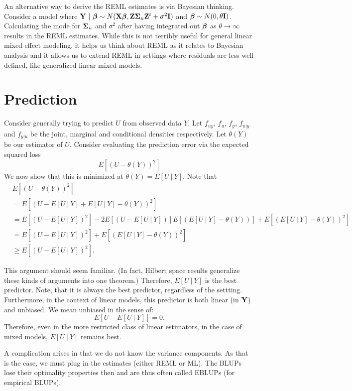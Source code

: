 An alternative way to derive the REML estimates is via Bayesian thinking. Consider a 
model where $\mathbf{Y} ~|~\boldsymbol{\beta} \sim N(\mathbf{X} \boldsymbol{\beta}, \mathbf{Z} \boldsymbol{\Sigma}_u \mathbf{Z}^t +\sigma^2 \mathbf{I})$ 
and $\boldsymbol{\beta} \sim N(0, \theta \mathbf{I})$. Calculating the mode for $\boldsymbol{\Sigma}_u$ and $\sigma^2$
after having integrated out $\boldsymbol{\beta}$ as $\theta \rightarrow \infty$ results in the REML estimates.
While this is not terribly useful for general linear mixed effect modeling, it helps us think
about REML as it relates to Bayesian analysis and it allows us to extend REML in settings
where residuals are less well defined, like generalized linear mixed models.


\section{Prediction}

Consider generally trying to predict $U$ from observed data $Y$. 
Let $f_{uy}$, $f_u$, $f_y$, $f_{u|y}$ and $f_{y|u}$ be the
joint, marginal and conditional densities respectively. Let
$\theta(Y)$ be our estimator of $U$. Consider
evaluating the prediction error via the expected squared loss
$$
E[(U -\theta(Y))^2]
$$
We now show that this is  minimized at $\theta(Y) = E[U ~|~ Y]$. 
Note that
\begin{align*}
& E[(U -\theta(Y))^2] \\ 
& = E[(U - E[U ~|~ Y] + E[U ~|~ Y] - \theta(Y))^2] \\
& = E[(U - E[U ~|~ Y])^2] - 2 E[(U - E[U~|~Y])]E[(E[U~|~Y] - \theta(Y))] + E[(E[U~|~Y] - \theta(Y))^2] \\
& = E[(U - E[U ~|~ Y])^2] + E[(E[U~|~Y] - \theta(Y))^2] \\
& \geq E[(U - E[U ~|~ Y])^2].
\end{align*}

This argument should seem familiar. (In fact, Hilbert space results generalize these
kinds of arguments into one theorem.) Therefore, $E[U~|~Y]$ is the best
predictor. Note, that it is always the best predictor, regardless of the settting.
Furthermore, in the context of linear models, this predictor is both linear (in $\mathbf{Y}$)
and unbiased. We mean unbiased in the sense of:
$$
E[ U - E[U ~|~ Y]] = 0.
$$
Therefore, even in the more restricted class of linear estimators, in the
case of mixed models, $E[U ~|~ Y]$ remains best. 

A complication arises in that we do not know the variance components. As
that is the case, we must plug in the estimates (either REML or ML). 
The BLUPs lose their optimality properties then and are thus often called
EBLUPs (for empirical BLUPs). 

